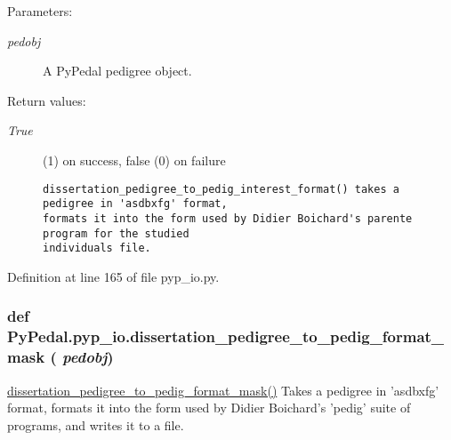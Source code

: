 \begin{Desc}
\item[Parameters:]
\begin{description}
\item[{\em pedobj}]A Py\-Pedal pedigree object. \end{description}
\end{Desc}
\begin{Desc}
\item[Return values:]
\begin{description}
\item[{\em True}](1) on success, false (0) on failure

\footnotesize\begin{verbatim}dissertation_pedigree_to_pedig_interest_format() takes a pedigree in 'asdbxfg' format,
formats it into the form used by Didier Boichard's parente program for the studied
individuals file.
\end{verbatim}
\normalsize
 \end{description}
\end{Desc}


Definition at line 165 of file pyp\_\-io.py.\hypertarget{namespacePyPedal_1_1pyp__io_0515e767770eaaddb1ce12e90b2edf04}{
\subsubsection[dissertation\_\-pedigree\_\-to\_\-pedig\_\-format\_\-mask]{\setlength{\rightskip}{0pt plus 5cm}def Py\-Pedal.pyp\_\-io.dissertation\_\-pedigree\_\-to\_\-pedig\_\-format\_\-mask ( {\em pedobj})}}
\label{namespacePyPedal_1_1pyp__io_0515e767770eaaddb1ce12e90b2edf04}


\hyperlink{namespacePyPedal_1_1pyp__io_0515e767770eaaddb1ce12e90b2edf04}{dissertation\_\-pedigree\_\-to\_\-pedig\_\-format\_\-mask()} Takes a pedigree in 'asdbxfg' format, formats it into the form used by Didier Boichard's 'pedig' suite of programs, and writes it to a file. 


